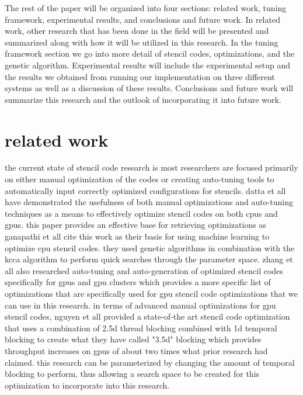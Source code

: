 \documentclass[conference]{IEEEtran}
\newcommand {\todo}[1] {\textcolor{red}{#1}}
\begin{document}
	The rest of the paper will be organized into four sections: related work, tuning framework, experimental results, and conclusions and future work. In related work, other research that has been done in the field will be presented and summarized along with how it will be utilized in this research. In the tuning framework section we go into more detail of stencil codes, optimizations, and the genetic algorithm. Experimental results will include the experimental setup and the results we obtained from running our implementation on three different systems as well as a discussion of these results. Conclusions and future work will summarize this research and the outlook of incorporating it into future work.

\section{related work}
	the current state of stencil code research is most researchers are focused primarily on either manual optimization of the codes or creating auto-tuning tools to automatically input correctly optimized configurations for stencils. datta et all have demonstrated the usefulness of both manual optimizations and auto-tuning techniques as a means to effectively optimize stencil codes on both cpus and gpus\cite{datta}. this paper provides an effective base for retrieving optimizations as ganapathi et all cite this work as their basis for using machine learning to optimize cpu stencil codes. they used genetic algorithms in combination with the kcca algorithm to perform quick searches through the parameter space\cite{ganapathi}. zhang et all also researched auto-tuning and auto-generation of optimized stencil codes specifically for gpus and gpu clusters which provides a more specific list of optimizations that are specifically used for gpu stencil code optimizations that we can use in this research\cite{zhang}. in terms of advanced manual optimizations for gpu stencil codes, nguyen et all provided a state-of-the art stencil code optimization that uses a combination of 2.5d thread blocking combined with 1d temporal blocking to create what they have called "3.5d" blocking which provides throughput increases on gpus of about two times what prior research had claimed\cite{nguy}. this research can be parameterized by changing the amount of temporal blocking to perform, thus allowing a search space to be created for this optimization to incorporate into this research.
\end{document}
